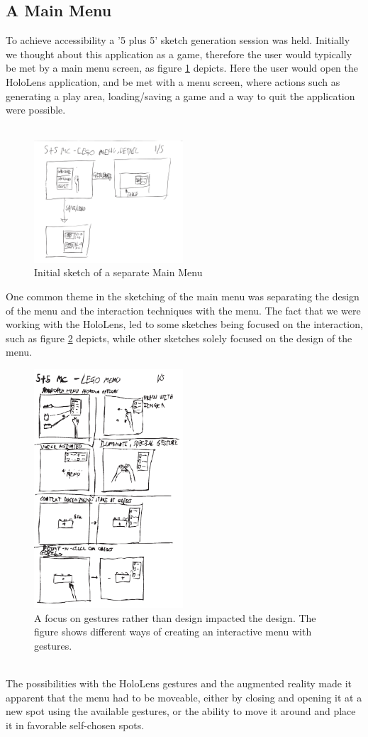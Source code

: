 \subsection{A Main Menu}
To achieve accessibility a '5 plus 5' sketch generation session was held. Initially we thought about this application as a game, therefore the user would typically be met by a main menu screen, as figure \ref{fig:menu8} depicts. Here the user would open the HoloLens application, and be met with a menu screen, where actions such as generating a play area, loading/saving a game and a way to quit the application were possible. \\\\
\begin{figure}[t]
	\centering
	\includegraphics[width=210px]{figures/Menu/menu8_1.pdf}
	\caption{Initial sketch of a separate Main Menu}
	\label{fig:menu8}
\end{figure}
One common theme in the sketching of the main menu was separating the design of the menu and the interaction techniques with the menu. The fact that we were working with the HoloLens, led to some sketches being focused on the interaction, such as figure \ref{fig:menugesture} depicts,  while other sketches solely focused on the design of the menu.\\
\begin{figure}[t]
	\centering
	\includegraphics[width=210px]{figures/Menu/menu5_1.pdf}
	\caption{A focus on gestures rather than design impacted the design. The figure shows different ways of creating an interactive menu with gestures.}
	\label{fig:menugesture}
\end{figure}
\\
The possibilities with the HoloLens gestures and the augmented reality made it apparent that the menu had to be moveable, either by closing and opening it at a new spot using the available gestures, or the ability to move it around and place it in favorable self-chosen spots.
